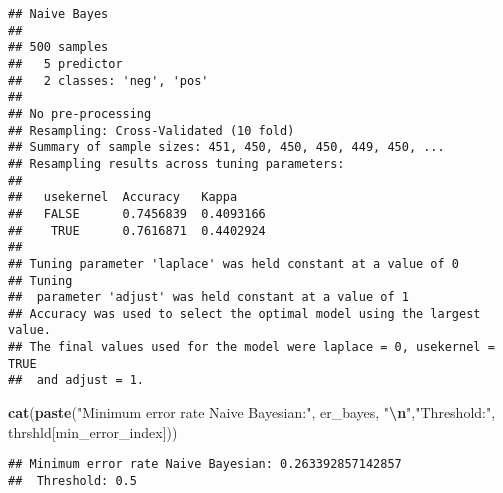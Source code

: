 \documentclass[
]{article}
\newenvironment{Shaded}{\begin{snugshade}}{\end{snugshade}}
\newcommand{\AttributeTok}[1]{\textcolor[rgb]{0.13,0.29,0.53}{#1}}
\newcommand{\CommentTok}[1]{\textcolor[rgb]{0.56,0.35,0.01}{\textit{#1}}}
\newcommand{\DecValTok}[1]{\textcolor[rgb]{0.00,0.00,0.81}{#1}}
\newcommand{\FunctionTok}[1]{\textcolor[rgb]{0.13,0.29,0.53}{\textbf{#1}}}
\newcommand{\NormalTok}[1]{#1}
\newcommand{\OtherTok}[1]{\textcolor[rgb]{0.56,0.35,0.01}{#1}}
\newcommand{\SpecialCharTok}[1]{\textcolor[rgb]{0.81,0.36,0.00}{\textbf{#1}}}
\newcommand{\StringTok}[1]{\textcolor[rgb]{0.31,0.60,0.02}{#1}}
\begin{document}
\begin{verbatim}
## Naive Bayes 
## 
## 500 samples
##   5 predictor
##   2 classes: 'neg', 'pos' 
## 
## No pre-processing
## Resampling: Cross-Validated (10 fold) 
## Summary of sample sizes: 451, 450, 450, 450, 449, 450, ... 
## Resampling results across tuning parameters:
## 
##   usekernel  Accuracy   Kappa    
##   FALSE      0.7456839  0.4093166
##    TRUE      0.7616871  0.4402924
## 
## Tuning parameter 'laplace' was held constant at a value of 0
## Tuning
##  parameter 'adjust' was held constant at a value of 1
## Accuracy was used to select the optimal model using the largest value.
## The final values used for the model were laplace = 0, usekernel = TRUE
##  and adjust = 1.
\end{verbatim}

\begin{Shaded}
\begin{Highlighting}[]
\FunctionTok{cat}\NormalTok{(}\FunctionTok{paste}\NormalTok{(}\StringTok{"Minimum error rate Naive Bayesian:"}\NormalTok{, er\_bayes,}
          \StringTok{"}\SpecialCharTok{\textbackslash{}n}\StringTok{"}\NormalTok{,}\StringTok{"Threshold:"}\NormalTok{, thrshld[min\_error\_index]))}
\end{Highlighting}
\end{Shaded}

\begin{verbatim}
## Minimum error rate Naive Bayesian: 0.263392857142857 
##  Threshold: 0.5
\end{verbatim}

\begin{Shaded}
\end{Shaded}
\end{document}
